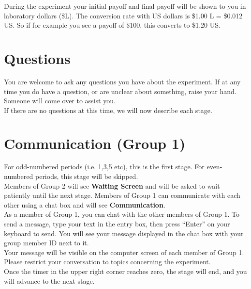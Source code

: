\documentclass[12pt]{article}
\begin{document}
During the experiment your initial payoff and final payoff will be shown to you in laboratory dollars (\$L).  The conversion rate with US dollars is \$1.00 L = \$0.012 US. So if for example you see a payoff of \$100, this converts to \$1.20 US. 


\section*{Questions}

You are welcome to ask any questions you have about the experiment.  If at any time you do have a question, or are unclear about something, raise your hand. Someone will come over to assist you.\\

If there are no questions at this time, we will now describe each stage.


   

\newpage




\section{Communication (Group 1)}


For odd-numbered periods (i.e. 1,3,5 etc), this is the first stage. For even-numbered periods, this stage will be skipped.\\ 

Members of Group 2 will see {\bf Waiting Screen} and will be asked to wait patiently until the next stage. Members of Group 1 can communicate with each other using a chat box and will see {\bf Communication}.\\  

As a member of Group 1, you can chat with the other members of Group 1.  To send a message, type your text in the entry box, then press ``Enter'' on your keyboard to send.  You will see your message displayed in the chat box with your group member ID next to it.\\ 

Your message will be visible on the computer screen of each member of Group 1. Please restrict your conversation to topics concerning the experiment.\\  

Once the timer in the upper right corner reaches zero, the stage will end, and you will advance to the next stage.\\
\end{document}
